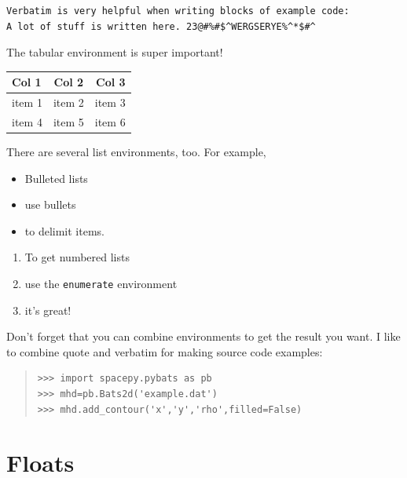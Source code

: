 \documentclass[12pt, letterpaper]{article}
\begin{document}
\begin{verbatim}
Verbatim is very helpful when writing blocks of example code:
A lot of stuff is written here. 23@#%#$^WERGSERYE%^*$#^
\end{verbatim}

The tabular environment is super important!
\begin{tabular}{l|c|r}
  Col 1 & Col 2 & Col 3\\
  \hline
  item 1 & item 2 & item 3\\  %
  item 4 & item 5 & item 6\\  %
\end{tabular}

There are several list environments, too.  For example, 
\begin{itemize}
  \item Bulleted lists
  \item use bullets
  \item to delimit items.    
\end{itemize}

\begin{enumerate}
  \item To get numbered lists
  \item use the {\tt enumerate} environment
  \item it's great!
\end{enumerate}

Don't forget that you can combine environments to get the result you want.
I like to combine quote and verbatim for making source code examples:
\begin{quote}
\begin{verbatim}
>>> import spacepy.pybats as pb
>>> mhd=pb.Bats2d('example.dat')
>>> mhd.add_contour('x','y','rho',filled=False)
\end{verbatim}
\end{quote}


\section{Floats}
\end{document}
